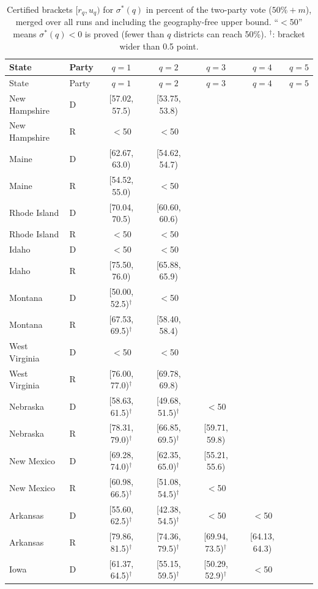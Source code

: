 \begin{longtable}{llccccc}
\caption{Certified brackets $[r_q,u_q)$ for $\sigma^*(q)$ in percent of the two-party vote ($50\%+m$), merged over all runs and including the geography-free upper bound. ``$<$50'' means $\sigma^*(q)<0$ is proved (fewer than $q$ districts can reach 50\%). $^\dagger$: bracket wider than 0.5 point.}\label{tab:spectrum} \\
\toprule
State & Party & $q=1$ & $q=2$ & $q=3$ & $q=4$ & $q=5$ \\
\midrule
\endfirsthead
\toprule
State & Party & $q=1$ & $q=2$ & $q=3$ & $q=4$ & $q=5$ \\
\midrule
\endhead
New Hampshire & D & [57.02, 57.5) & [53.75, 53.8) &  &  &  \\
New Hampshire & R & $<$50 & $<$50 &  &  &  \\
Maine & D & [62.67, 63.0) & [54.62, 54.7) &  &  &  \\
Maine & R & [54.52, 55.0) & $<$50 &  &  &  \\
Rhode Island & D & [70.04, 70.5) & [60.60, 60.6) &  &  &  \\
Rhode Island & R & $<$50 & $<$50 &  &  &  \\
Idaho & D & $<$50 & $<$50 &  &  &  \\
Idaho & R & [75.50, 76.0) & [65.88, 65.9) &  &  &  \\
Montana & D & [50.00, 52.5)$^\dagger$ & $<$50 &  &  &  \\
Montana & R & [67.53, 69.5)$^\dagger$ & [58.40, 58.4) &  &  &  \\
West Virginia & D & $<$50 & $<$50 &  &  &  \\
West Virginia & R & [76.00, 77.0)$^\dagger$ & [69.78, 69.8) &  &  &  \\
Nebraska & D & [58.63, 61.5)$^\dagger$ & [49.68, 51.5)$^\dagger$ & $<$50 &  &  \\
Nebraska & R & [78.31, 79.0)$^\dagger$ & [66.85, 69.5)$^\dagger$ & [59.71, 59.8) &  &  \\
New Mexico & D & [69.28, 74.0)$^\dagger$ & [62.35, 65.0)$^\dagger$ & [55.21, 55.6) &  &  \\
New Mexico & R & [60.98, 66.5)$^\dagger$ & [51.08, 54.5)$^\dagger$ & $<$50 &  &  \\
Arkansas & D & [55.60, 62.5)$^\dagger$ & [42.38, 54.5)$^\dagger$ & $<$50 & $<$50 &  \\
Arkansas & R & [79.86, 81.5)$^\dagger$ & [74.36, 79.5)$^\dagger$ & [69.94, 73.5)$^\dagger$ & [64.13, 64.3) &  \\
Iowa & D & [61.37, 64.5)$^\dagger$ & [55.15, 59.5)$^\dagger$ & [50.29, 52.9)$^\dagger$ & $<$50 &  \\

\end{longtable}
